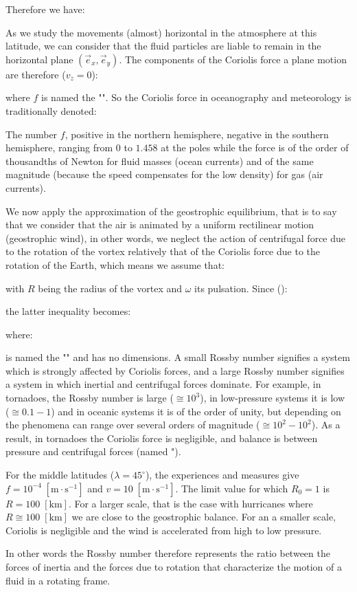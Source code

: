 	Therefore we have:
	
	As we study the movements (almost) horizontal in the atmosphere at this latitude, we can consider that the fluid particles are liable to remain in the horizontal plane $(\vec{e}_x,\vec{e}_y)$. The components of the Coriolis force a plane motion are therefore ($v_z=0$):
	
	where $f$ is named the "". So the Coriolis force in oceanography and meteorology is traditionally denoted:
	
	The number $f$, positive in the northern hemisphere, negative in the southern hemisphere, ranging from $0$ to $1.458$ at the poles while the force is of the order of thousandths of Newton for fluid masses (ocean currents) and of the same magnitude (because the speed compensates for the low density) for gas (air currents).
	
	We now apply the approximation of the geostrophic equilibrium, that is to say that we consider that the air is animated by a uniform rectilinear motion (geostrophic wind), in other words, we neglect the action of centrifugal force due to the rotation of the vortex relatively that of the Coriolis force due to the rotation of the Earth, which means we assume that:
	
	with $R$ being the radius of the vortex and $\omega$ its pulsation. Since ():
	
	the latter inequality becomes:
	
	where:
	
	is named the "" and has no dimensions. A small Rossby number signifies a system which is strongly affected by Coriolis forces, and a large Rossby number signifies a system in which inertial and centrifugal forces dominate. For example, in tornadoes, the Rossby number is large ($\cong 10^3$), in low-pressure systems it is low ($\cong 0.1-1$) and in oceanic systems it is of the order of unity, but depending on the phenomena can range over several orders of magnitude ($\cong 10^2-10^2$). As a result, in tornadoes the Coriolis force is negligible, and balance is between pressure and centrifugal forces (named "). 
	\begin{tcolorbox}[title=Remark,colframe=black,arc=10pt]
	For the middle latitudes ($\lambda=45^\circ$), the experiences and measures give $f=10^{-4}\;[\text{m}\cdot\text{s}^{-1}]$ and $v=10\;[\text{m}\cdot \text{s}^{-1}]$. The limit value for which $R_0=1$ is $R=100\;[\text{km}]$. For a larger scale, that is the case with hurricanes where $R\cong 100\;[\text{km}]$ we are close to the geostrophic balance. For an  a smaller scale, Coriolis is negligible and the wind is accelerated from high to low pressure.
	\end{tcolorbox}
	In other words the Rossby number therefore represents the ratio between the forces of inertia and the forces due to rotation that characterize the motion of a fluid in a rotating frame.

